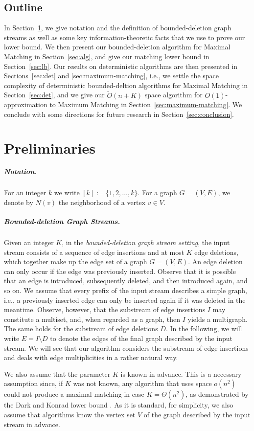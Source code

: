 \documentclass[11pt,a4paper]{article}
\begin{document}
\subsection{Outline}
In Section~\ref{sec:prelim}, we give notation and the definition of bounded-deletion graph streams as well as some key information-theoretic facts that we use to prove our lower bound. 
We then present our bounded-deletion algorithm for \textsf{Maximal Matching} in Section~\ref{sec:alg}, and give our matching lower bound in Section~\ref{sec:lb}. Our results on deterministic algorithms are then presented in Sections~\ref{sec:det} and \ref{sec:maximum-matching}, i.e., we settle the space complexity of deterministic bounded-deltion algorithms for \textsf{Maximal Matching} in Section~\ref{sec:det}, and we give our $\tilde{O}( n + K)$ space algorithm for $O(1)$-approximation to \textsf{Maximum Matching} in Section~\ref{sec:maximum-matching}. We conclude with some directions for future research in Section~\ref{sec:conclusion}.

\section{Preliminaries}\label{sec:prelim}
\subparagraph{Notation.} For an integer $k$ we write $[k] := \{1, 2, \dots, k \}$. For a graph $G=(V, E)$, we denote by $N(v)$ the neighborhood of a vertex $v \in V$.

\subparagraph{Bounded-deletion Graph Streams.} Given an integer $K$, in the {\em bounded-deletion graph stream setting}, the input stream consists of a sequence of edge insertions and at most $K$ edge deletions, which together make up the edge set of a graph $G=(V, E)$. An edge deletion can only occur if the edge was previously inserted. Observe that it is possible that an edge is introduced, subsequently deleted, and then introduced again, and so on. We assume that every prefix of the input stream describes a simple graph, i.e., a previously inserted edge can only be inserted again if it was deleted in the meantime.  Observe, however, that the substream of edge insertions $I$ may constitute a multiset, and, when regarded as a graph, then $I$ yields a multigraph. The same holds for the substream of edge deletions $D$. In the following, we will write $E= I \setminus D$ to denote the edges of the final graph described by the input stream.  We will see that our algorithm considers the substream of edge insertions and deals with edge multiplicities in a rather natural way. 

We also assume that the parameter $K$ is known in advance. This is a necessary assumption since, if $K$ was not known, any algorithm that uses space $o(n^2)$ could not produce a maximal matching in case $K= \Theta(n^2)$, as demonstrated by the Dark and Konrad lower bound \cite{dk20}. As it is standard, for simplicity, we also assume that algorithms know the vertex set $V$ of the graph described by the input stream in advance.
\end{document}
